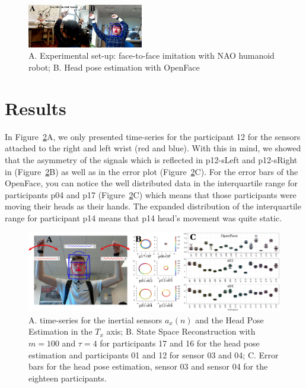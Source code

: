 \documentclass{sigchi}
\begin{document}
\begin{figure}
\centering
\includegraphics[width=0.45\textwidth]{figures/experiment/fig_w619h233}
\caption[PA]{A. Experimental set-up: face-to-face imitation with NAO humanoid robot;
B. Head pose estimation with OpenFace \cite{Baltrusaitis2016} }
\label{fig:exp}
\end{figure}

\section{Results}
In Figure~\ref{fig:main}A, we only presented time-series for the participant 12
for the sensors attached to the right and left wrist (red and blue).
With this in mind, we showed that the asymmetry of the signals which is
reflected in p12-sLeft and p12-sRight in (Figure~\ref{fig:main}B) as well as in the
error plot (Figure~\ref{fig:main}C).
For the error bars of the OpenFace, you can notice the well distributed
data in the interquartile range for participants p04 and p17 (Figure~\ref{fig:main}C)
which means that those participants were moving their heads as their hands.
The expanded distribution of the interquartile range for participant p14
means that p14 head's movement was quite static.
\begin{figure}[!htb]
\centering
\includegraphics[width=1.00\textwidth]{figures/results/main/figv01}
\caption[PA]{
A. time-series for the inertial sensors $a_x(n)$ and the
Head Pose Estimation in the $T_x$ axis;
B. State Space Reconstruction with $m=100$ and $\tau=4$ for
participants 17 and 16 for the head pose estimation and
participants 01 and 12 for sensor 03 and 04;
C. Error bars for the head pose estimation, sensor 03 and sensor 04 for
the eighteen participants.}
\label{fig:main}
\end{figure}
\end{document}
